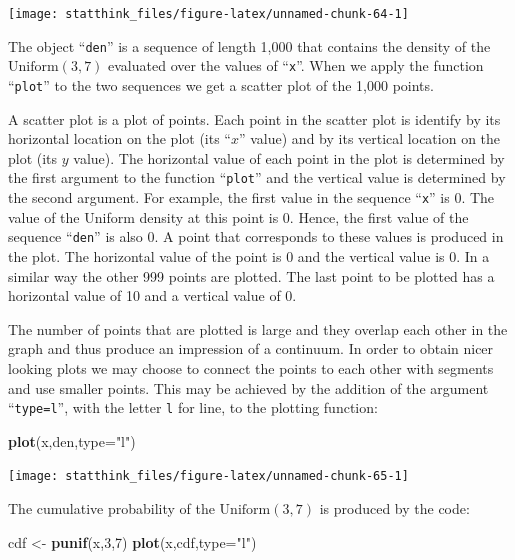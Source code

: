 \documentclass[]{krantz}
\makeatletter
\newenvironment{Shaded}{\begin{snugshade}}{\end{snugshade}}
\newcommand{\KeywordTok}[1]{\textcolor[rgb]{0.13,0.29,0.53}{\textbf{#1}}}
\newcommand{\DataTypeTok}[1]{\textcolor[rgb]{0.13,0.29,0.53}{#1}}
\newcommand{\DecValTok}[1]{\textcolor[rgb]{0.00,0.00,0.81}{#1}}
\newcommand{\StringTok}[1]{\textcolor[rgb]{0.31,0.60,0.02}{#1}}
\newcommand{\NormalTok}[1]{#1}
\newenvironment{kframe}{%
\medskip{}
\setlength{\fboxsep}{.8em}
 \def\at@end@of@kframe{}%
 \ifinner\ifhmode%
  \def\at@end@of@kframe{\end{minipage}}%
  \begin{minipage}{\columnwidth}%
 \fi\fi%
 \def\FrameCommand##1{\hskip\@totalleftmargin \hskip-\fboxsep
 \colorbox{shadecolor}{##1}\hskip-\fboxsep
     \hskip-\linewidth \hskip-\@totalleftmargin \hskip\columnwidth}%
 \MakeFramed {\advance\hsize-\width
   \@totalleftmargin\z@ \linewidth\hsize
   \@setminipage}}%
 {\par\unskip\endMakeFramed%
 \at@end@of@kframe}
\renewenvironment{Shaded}{\begin{kframe}}{\end{kframe}}
\theoremstyle{definition}
\theoremstyle{definition}
\theoremstyle{definition}
\theoremstyle{remark}
\makeatother
\begin{document}
\begin{center}\texttt{[image: statthink\_files/figure-latex/unnamed-chunk-64-1]} \end{center}

The object ``\texttt{den}'' is a sequence of length 1,000 that contains
the density of the \(\mathrm{Uniform}(3,7)\) evaluated over the values
of ``\texttt{x}''. When we apply the function ``\texttt{plot}'' to the
two sequences we get a scatter plot of the 1,000 points.

A scatter plot is a plot of points. Each point in the scatter plot is
identify by its horizontal location on the plot (its ``\(x\)'' value)
and by its vertical location on the plot (its \(y\) value). The
horizontal value of each point in the plot is determined by the first
argument to the function ``\texttt{plot}'' and the vertical value is
determined by the second argument. For example, the first value in the
sequence ``\texttt{x}'' is 0. The value of the Uniform density at this
point is 0. Hence, the first value of the sequence ``\texttt{den}'' is
also 0. A point that corresponds to these values is produced in the
plot. The horizontal value of the point is 0 and the vertical value is
0. In a similar way the other 999 points are plotted. The last point to
be plotted has a horizontal value of 10 and a vertical value of 0.

The number of points that are plotted is large and they overlap each
other in the graph and thus produce an impression of a continuum. In
order to obtain nicer looking plots we may choose to connect the points
to each other with segments and use smaller points. This may be achieved
by the addition of the argument ``\texttt{type=l}'', with the letter
\texttt{l} for line, to the plotting function:

\begin{Shaded}
\begin{Highlighting}[]
\KeywordTok{plot}\NormalTok{(x,den,}\DataTypeTok{type=}\StringTok{"l"}\NormalTok{)}
\end{Highlighting}
\end{Shaded}

\begin{center}\texttt{[image: statthink\_files/figure-latex/unnamed-chunk-65-1]} \end{center}

The cumulative probability of the \(\mathrm{Uniform}(3,7)\) is produced
by the code:

\begin{Shaded}
\begin{Highlighting}[]
\NormalTok{cdf <-}\StringTok{ }\KeywordTok{punif}\NormalTok{(x,}\DecValTok{3}\NormalTok{,}\DecValTok{7}\NormalTok{)}
\KeywordTok{plot}\NormalTok{(x,cdf,}\DataTypeTok{type=}\StringTok{"l"}\NormalTok{)}
\end{Highlighting}
\end{Shaded}
\end{document}
